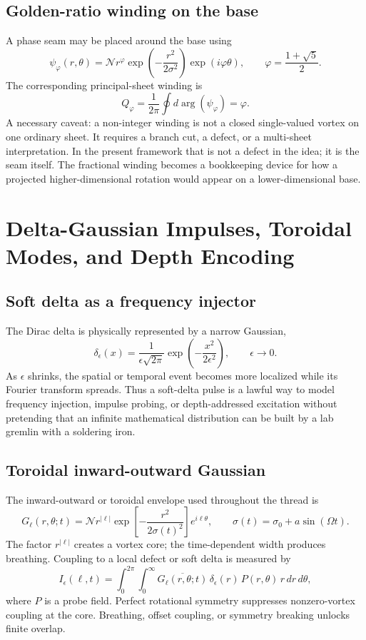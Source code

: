 \documentclass[12pt,a4paper]{article}
\begin{document}
\subsection{Golden-ratio winding on the base}
A phase seam may be placed around the base using
\[
\psi_\varphi(r,\theta)=\mathcal N r^{\varphi}\exp\!\left(-\frac{r^2}{2\sigma^2}\right)\exp(i\varphi\theta),
\qquad \varphi=\frac{1+\sqrt5}{2}.
\]
The corresponding principal-sheet winding is
\[
Q_\varphi=\frac{1}{2\pi}\oint d\arg(\psi_\varphi)=\varphi.
\]
A necessary caveat: a non-integer winding is not a closed single-valued vortex on one ordinary sheet.  It requires a branch cut, a defect, or a multi-sheet interpretation.  In the present framework that is not a defect in the idea; it is the seam itself.  The fractional winding becomes a bookkeeping device for how a projected higher-dimensional rotation would appear on a lower-dimensional base.

\section{Delta-Gaussian Impulses, Toroidal Modes, and Depth Encoding}
\label{sec:delta-toroid}
\subsection{Soft delta as a frequency injector}
The Dirac delta is physically represented by a narrow Gaussian,
\[
\delta_\epsilon(x)=\frac{1}{\epsilon\sqrt{2\pi}}\exp\!\left(-\frac{x^2}{2\epsilon^2}\right),\qquad \epsilon\rightarrow0.
\]
As \(\epsilon\) shrinks, the spatial or temporal event becomes more localized while its Fourier transform spreads.  Thus a soft-delta pulse is a lawful way to model frequency injection, impulse probing, or depth-addressed excitation without pretending that an infinite mathematical distribution can be built by a lab gremlin with a soldering iron.

\subsection{Toroidal inward-outward Gaussian}
The inward-outward or toroidal envelope used throughout the thread is
\[
G_\ell(r,\theta;t)=\mathcal N r^{|\ell|}\exp\!\left[-\frac{r^2}{2\sigma(t)^2}\right]e^{i\ell\theta},
\qquad \sigma(t)=\sigma_0+a\sin(\Omega t).
\]
The factor \(r^{|\ell|}\) creates a vortex core; the time-dependent width produces breathing.  Coupling to a local defect or soft delta is measured by
\[
I_\epsilon(\ell,t)=\int_0^{2\pi}\int_0^\infty
\overline{G_\ell(r,\theta;t)}\,\delta_\epsilon(r)\,P(r,\theta)\, r\,dr\,d\theta,
\]
where \(P\) is a probe field.  Perfect rotational symmetry suppresses nonzero-vortex coupling at the core.  Breathing, offset coupling, or symmetry breaking unlocks finite overlap.
\end{document}
